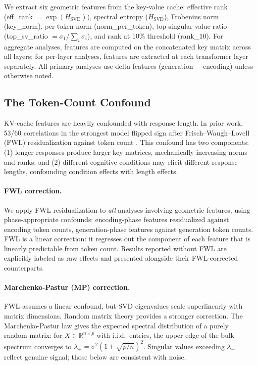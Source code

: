 \documentclass[11pt,a4paper]{article}
\begin{document}
We extract six geometric features from the key-value cache: effective rank
(eff\_rank $= \exp(H_{\text{SVD}})$), spectral entropy ($H_{\text{SVD}}$),
Frobenius norm (key\_norm), per-token norm (norm\_per\_token), top singular
value ratio (top\_sv\_ratio $= \sigma_1 / \sum_i \sigma_i$), and rank at
10\% threshold (rank\_10). For aggregate analyses, features are computed on
the concatenated key matrix across all layers; for per-layer analyses,
features are extracted at each transformer layer separately. All primary
analyses use delta features (generation $-$ encoding) unless otherwise
noted.

\subsection{The Token-Count Confound}

KV-cache features are heavily confounded with response length. In prior
work, 53/60 correlations in the strongest model flipped sign after
Frisch--Waugh--Lovell (FWL) residualization
\citep{frisch1933partial,lovell1963seasonal} against token count
\citep{lyra2026campaign3}. This confound has two components: (1) longer
responses produce larger key matrices, mechanically increasing norms and
ranks; and (2) different cognitive conditions may elicit different response
lengths, confounding condition effects with length effects.

\paragraph{FWL correction.} We apply FWL residualization to \emph{all}
analyses involving geometric features, using phase-appropriate confounds:
encoding-phase features residualized against encoding token counts,
generation-phase features against generation token counts. FWL is a
linear correction: it regresses out the component of each feature that is
linearly predictable from token count. Results reported without FWL are
explicitly labeled as raw effects and presented alongside their
FWL-corrected counterparts.

\paragraph{Marchenko-Pastur (MP) correction.} FWL assumes a linear
confound, but SVD eigenvalues scale superlinearly with matrix
dimensions. Random matrix theory provides a stronger correction. The
Marchenko-Pastur law \citep{marchenko1967distribution} gives the
expected spectral distribution of a purely random matrix: for
$X \in \mathbb{R}^{n \times p}$ with i.i.d.\ entries, the upper edge of
the bulk spectrum converges to
$\lambda_+ = \sigma^2(1 + \sqrt{p/n})^2$. Singular values exceeding
$\lambda_+$ reflect genuine signal; those below are consistent with
noise.
\end{document}
